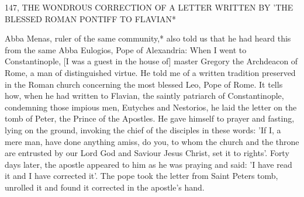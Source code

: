 147, THE WONDROUS CORRECTION
OF A LETTER WRITTEN BY
'THE BLESSED ROMAN PONTIFF TO FLAVIAN*

Abba Menas, ruler of the same community,* also told us that he
had heard this from the same Abba Eulogios, Pope of Alexandria:
When I went to Constantinople, [I was a guest in the house of]
master Gregory the Archdeacon of Rome, a man of distinguished
virtue.
He told me of a written tradition preserved in the Roman
church concerning the most blessed Leo, Pope of Rome.
It tells
how, when he had written to Flavian, the saintly patriarch of
Constantinople, condemning those impious men, Eutyches and
Nestorios, he laid the letter on the tomb of Peter, the Prince of the
Apostles.
He gave himself to prayer and fasting, lying on the
ground, invoking the chief of the disciples in these words: 'If I, a
mere man, have done anything amiss, do you, to whom the church
and the throne are entrusted by our Lord God and Saviour Jesus
Christ, set it to rights'.
Forty days later, the apostle appeared to him
as he was praying and said: 'I have read it and I have corrected it'.
The pope took the letter from Saint Peter\textquotesingle s tomb, unrolled it and
found it corrected in the apostle's hand.

